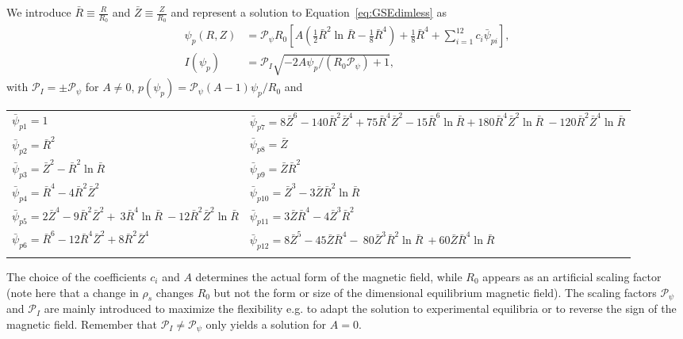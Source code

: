 We introduce \(\bar{R} \equiv \frac{R}{R_0}\) and \(\bar{Z} \equiv\frac{Z}{R_0}\)
and represent a solution to Equation~\eqref{eq:GSEdimless} as~\cite{Cerfon2010}
\begin{subequations}
\label{eq:solovev}
\begin{align}
 \psi_p (R,Z) &= \mathcal P_{\psi} R_0 \left[ A\left( \frac{1}{2} \bar{R}^2 \ln{\bar{R}}
   - \frac{1}{8}\bar{R}^4\right)+ \frac{1}{8}\bar{R}^4 
   + \sum_{i=1}^{12} c_{i}  \bar{\psi}_{pi}\right],\\
   I(\psi_p) &= \mathcal P_I\sqrt{ - 2A\psi_p/(R_0\mathcal P_{\psi}) +1},
\end{align}
\end{subequations}
with $\mathcal P_I = \pm \mathcal P_\psi$ for $A\neq 0$, $p(\psi_p) = \mathcal P_\psi (A-1)\psi_p/R_0$ and
\begin{longtable}{>{\RaggedRight}p{7cm}>{\RaggedRight}p{7cm}}
\toprule
  $\bar{\psi}_{p1}=1$
  & $\bar{\psi}_{p7}=8\bar{Z}^6 -140 \bar{R}^2 \bar{Z}^4
                      + 75 \bar{R}^4 \bar{Z}^2 - 15\bar{R}^6\ln{\bar{R}}+ 180 \bar{R}^4 \bar{Z}^2 \ln{\bar{R}} \
                       -120 \bar{R}^2 \bar{Z}^4 \ln{\bar{R}}$\\
%
  $\bar{\psi}_{p2}=\bar{R}^2$ &
  $\bar{\psi}_{p8}=\bar{Z}$ \\
%
  $\bar{\psi}_{p3}=\bar{Z}^2 - \bar{R}^2 \ln{\bar{R}}$ &
  $\bar{\psi}_{p9}=\bar{Z}  \bar{R}^2$\\
%
  $\bar{\psi}_{p4}=\bar{R}^4 -4\bar{R}^2\bar{Z}^2$ &
  $\bar{\psi}_{p10}=\bar{Z}^3 - 3 \bar{Z} \bar{R}^2 \ln{\bar{R}}$\\
  $\bar{\psi}_{p5}=2\bar{Z}^4 - 9 \bar{R}^2\bar{Z}^2 + \
                     3 \bar{R}^4 \ln{\bar{R}} \
                    -12  \bar{R}^2\bar{Z}^2 \ln{\bar{R}}$
  &
$\bar{\psi}_{p11}=3 \bar{Z}\bar{R}^4 - 4\bar{Z}^3\bar{R}^2$\\
%
  $\bar{\psi}_{p6}=\bar{R}^6 -12 \bar{R}^4 \bar{Z}^2
                     + 8  \bar{R}^2 \bar{Z}^4$ &
  $\bar{\psi}_{p12}= 8 \bar{Z}^5 -45 \bar{Z} \bar{R}^4 - \
                       80 \bar{Z}^3 \bar{R}^2\ln{\bar{R}} \
                       +60 \bar{Z} \bar{R}^4\ln{\bar{R}}$ \\
   & \\
\bottomrule
\end{longtable}
The choice of the coefficients \(c_{i}\) and \(A\) determines the actual form of the magnetic field, while $R_0$ appears as an artificial scaling factor (note here that a change in $\rho_s$ changes $R_0$ but not the form or size of the dimensional equilibrium magnetic field).
The scaling factors $\mathcal P_\psi$ and $\mathcal P_I$ are mainly introduced to maximize the flexibility e.g. to adapt the solution to experimental equilibria or to reverse the sign of the magnetic field.
Remember that $\mathcal  P_I \neq \mathcal P_\psi$ only yields a solution for $A=0$.

